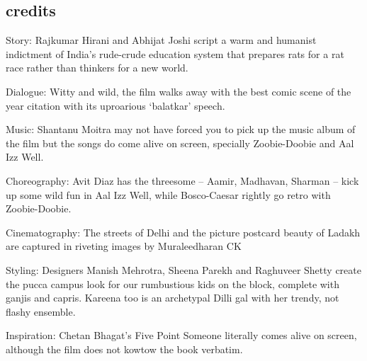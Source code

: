 \documentclass{article}
\begin{document}
\subsection{credits}

Story: Rajkumar Hirani and Abhijat Joshi script a warm and humanist indictment of India's rude-crude education system that prepares rats for a rat race rather than thinkers for a new world.

Dialogue: Witty and wild, the film walks away with the best comic scene of the year citation with its uproarious `balatkar' speech.

Music: Shantanu Moitra may not have forced you to pick up the music album of the film but the songs do come alive on screen, specially Zoobie-Doobie and Aal Izz Well.

Choreography: Avit Diaz has the threesome -- Aamir, Madhavan, Sharman -- kick up some wild fun in Aal Izz Well, while Bosco-Caesar rightly go retro with Zoobie-Doobie.

Cinematography: The streets of Delhi and the picture postcard beauty of Ladakh are captured in riveting images by Muraleedharan CK

Styling: Designers Manish Mehrotra, Sheena Parekh and Raghuveer Shetty create the pucca campus look for our rumbustious kids on the block, complete with ganjis and capris. Kareena too is an archetypal Dilli gal with her trendy, not flashy ensemble.

Inspiration: Chetan Bhagat's Five Point Someone literally comes alive on screen, although the film does not kowtow the book verbatim.
\end{document}
